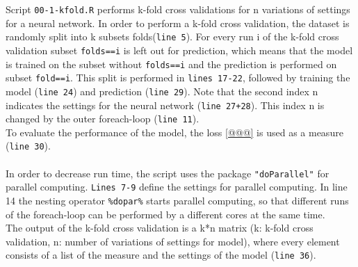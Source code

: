 \documentclass[a4paper,12pt]{article}
\begin{document}
Script \texttt{00-1-kfold.R} performs k-fold cross validations for n variations of settings for a neural network. In order to perform a k-fold cross validation, the dataset is randomly split into k subsets folds(\texttt{line 5}). For every run i of the k-fold cross validation subset \texttt{folds==i} is left out for prediction, which means that the model is trained on the subset without \texttt{folds==i} and the prediction is performed on subset \texttt{fold==i}. This split is performed in \texttt{lines 17-22}, followed by training the model (\texttt{line 24}) and prediction (\texttt{line 29}). Note that the second index n indicates the settings for the neural network (\texttt{line 27+28}). This index n is changed by the outer foreach-loop (\texttt{line 11}). \\
To evaluate the performance of the model, the loss \ref{@@@} is used as a measure (\texttt{line 30}). \\
\\
In order to decrease run time, the script uses the package \texttt{"doParallel"} for parallel computing. \texttt{Lines 7-9} define the settings for parallel computing. In line 14 the nesting operator \texttt{\%dopar\%} starts parallel computing, so that different runs of the foreach-loop can be performed by a different cores at the same time.\\ 
The output of the k-fold cross validation is a k*n matrix (k: k-fold cross validation, n: number of variations of settings for model), where every element consists of a list  of the measure and the settings of the model (\texttt{line 36}). \\
\end{document}
